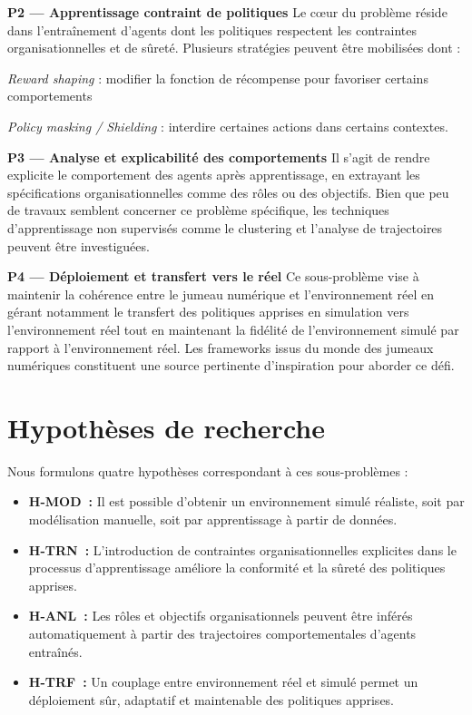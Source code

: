 \medskip
\noindent
\textbf{P2 — Apprentissage contraint de politiques}
Le cœur du problème réside dans l’entraînement d’agents dont les politiques respectent les contraintes organisationnelles et de sûreté. Plusieurs stratégies peuvent être mobilisées dont :
\begin{enumerate*}[label={\roman*) },itemjoin={~; \quad}]
  \item \emph{Reward shaping} : modifier la fonction de récompense pour favoriser certains comportements
  \item \emph{Policy masking / Shielding} : interdire certaines actions dans certains contextes.
\end{enumerate*}

\medskip
\noindent
\textbf{P3 — Analyse et explicabilité des comportements}
Il s’agit de rendre explicite le comportement des agents après apprentissage, en extrayant les spécifications organisationnelles comme des rôles ou des objectifs. Bien que peu de travaux semblent concerner ce problème spécifique, les techniques d'apprentissage non supervisés comme le clustering et l'analyse de trajectoires peuvent être investiguées.

\medskip
\noindent
\textbf{P4 — Déploiement et transfert vers le réel}
Ce sous-problème vise à maintenir la cohérence entre le jumeau numérique et l'environnement réel en gérant notamment le transfert des politiques apprises en simulation vers l’environnement réel tout en maintenant la fidélité de l'environnement simulé par rapport à l'environnement réel. Les frameworks issus du monde des jumeaux numériques constituent une source pertinente d'inspiration pour aborder ce défi.

\clearpage

\section{Hypothèses de recherche}

Nous formulons quatre hypothèses correspondant à ces sous-problèmes :

\begin{itemize}
  \item \textbf{H-MOD~:} Il est possible d’obtenir un environnement simulé réaliste, soit par modélisation manuelle, soit par apprentissage à partir de données.
  \item \textbf{H-TRN~:} L’introduction de contraintes organisationnelles explicites dans le processus d’apprentissage améliore la conformité et la sûreté des politiques apprises.
  \item \textbf{H-ANL~:} Les rôles et objectifs organisationnels peuvent être inférés automatiquement à partir des trajectoires comportementales d’agents entraînés.
  \item \textbf{H-TRF~:} Un couplage entre environnement réel et simulé permet un déploiement sûr, adaptatif et maintenable des politiques apprises.
\end{itemize}

